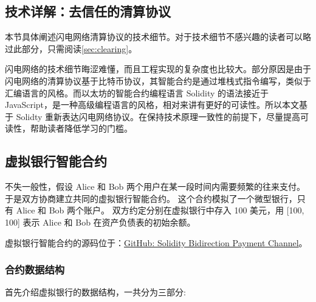 \begin{appendices}


\section{技术详解：去信任的清算协议}\label{sec:codes}
本节具体阐述闪电网络清算协议的技术细节。对于技术细节不感兴趣的读者可以略过此部分，只需阅读\ref{sec:clearing}。

闪电网络的技术细节晦涩难懂，而且工程实现的复杂度也比较大。部分原因是由于闪电网络的清算协议基于比特币协议，其智能合约是通过堆栈式指令编写，类似于汇编语言的风格。而以太坊的智能合约编程语言 Solidity 的语法接近于 JavaScript，是一种高级编程语言的风格，相对来讲有更好的可读性。所以本文基于 Solidty 重新表达闪电网络协议。在保持技术原理一致性的前提下，尽量提高可读性，帮助读者降低学习的门槛。

\subsection{虚拟银行智能合约}

不失一般性，假设 Alice 和 Bob 两个用户在某一段时间内需要频繁的往来支付。
于是双方协商建立共同的虚拟银行智能合约。
这个合约模拟了一个微型银行，只有 Alice 和 Bob 两个账户。
双方约定分别在虚拟银行中存入 100 美元，用 [100, 100] 表示 Alice 和 Bob 在资产负债表的初始余额。

虚拟银行智能合约的源码位于：\href{https://github.com/dapenghu/solidity-bidirection-payment-channel/blob/master/virtualBank/contracts/VirtualBank.sol}{GitHub: Solidity Bidirection Payment Channel}。

\subsubsection{合约数据结构}
首先介绍虚拟银行的数据结构，一共分为三部分:


\end{appendices}
